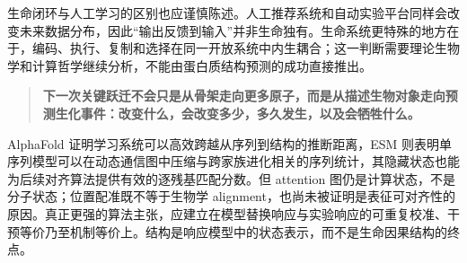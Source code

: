 \documentclass[10pt]{article}
\newenvironment{keyidea}
{\begin{quote}\color{ruleblue}\CJKfamily{sf}\large\bfseries}
{\end{quote}}
\begin{document}
生命闭环与人工学习的区别也应谨慎陈述。人工推荐系统和自动实验平台同样会改变未来数据分布，因此“输出反馈到输入”并非生命独有。生命系统更特殊的地方在于，编码、执行、复制和选择在同一开放系统中内生耦合；这一判断需要理论生物学和计算哲学继续分析，不能由蛋白质结构预测的成功直接推出。

\begin{keyidea}
下一次关键跃迁不会只是从骨架走向更多原子，而是从描述生物对象走向预测生化事件：改变什么，会改变多少，多久发生，以及会牺牲什么。
\end{keyidea}

AlphaFold 证明学习系统可以高效跨越从序列到结构的推断距离，ESM 则表明单序列模型可以在动态通信图中压缩与跨家族进化相关的序列统计，其隐藏状态也能为后续对齐算法提供有效的逐残基匹配分数。但 attention 图仍是计算状态，不是分子状态；位置配准既不等于生物学 alignment，也尚未被证明是表征可对齐性的原因。真正更强的算法主张，应建立在模型替换响应与实验响应的可重复校准、干预等价乃至机制等价上。结构是响应模型中的状态表示，而不是生命因果结构的终点。
\end{document}
